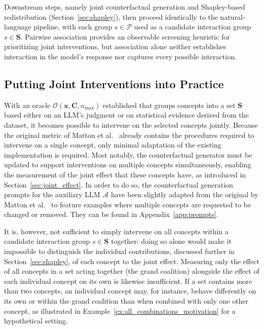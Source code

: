 Downstream steps, namely joint counterfactual generation and Shapley-based redistribution (Section~\ref{sec:shapley}), then proceed identically to the natural-language pipeline, with each group $s \in \mathcal{P}$ used as a candidate interaction group $s \in \mathbf{S}$. Pairwise association provides an observable screening heuristic for prioritizing joint interventions, but association alone neither establishes interaction in the model's response nor captures every possible interaction.

\subsection{Putting Joint Interventions into Practice}

With an oracle $\mathcal{O}(\mathbf{x}, \mathbf{C}, n_{\max})$ established that groups concepts into a set $\mathbf{S}$ based either on an LLM's judgment or on statistical evidence derived from the dataset, it becomes possible to intervene on the selected concepts jointly. Because the original metric of Matton et al.~\cite{mattonWalkTalkMeasuring2024} already contains the procedures required to intervene on a single concept, only minimal adaptation of the existing implementation is required. Most notably, the counterfactual generator must be updated to support interventions on multiple concepts simultaneously, enabling the measurement of the joint effect that these concepts have, as introduced in Section~\ref{sec:joint_effect}. In order to do so, the counterfactual generation prompts for the auxiliary LLM $\mathcal{A}$ have been slightly adapted from the original by Matton et al.~\cite{mattonWalkTalkMeasuring2024} to feature examples where multiple concepts are requested to be changed or removed. They can be found in Appendix~\ref{app:prompts}.

It is, however, not sufficient to simply intervene on all concepts within a candidate interaction group $s \in \mathbf{S}$ together: doing so alone would make it impossible to distinguish the individual contributions, discussed further in Section~\ref{sec:shapley}, of each concept to the joint effect. Measuring only the effect of all concepts in a set acting together (the grand coalition) alongside the effect of each individual concept on its own is likewise insufficient. If a set contains more than two concepts, an individual concept may, for instance, behave differently on its own or within the grand coalition than when combined with only one other concept, as illustrated in Example~\ref{ex:all_combinations_motivation} for a hypothetical setting.

